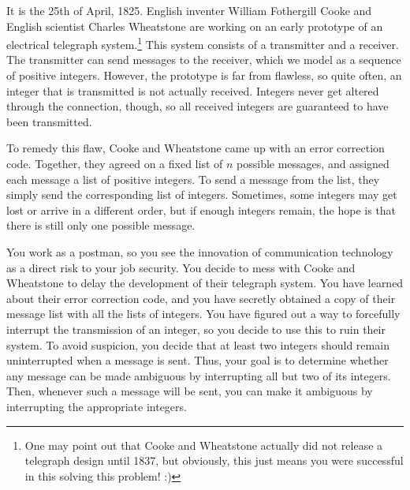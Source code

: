 

\newcommand{\maxn}{50\,000}
\newcommand{\maxk}{10^5}
\newcommand{\maxx}{10^9}

It is the 25th of April, 1825.
English inventer William Fothergill Cooke and English scientist Charles Wheatstone are working on an early prototype of an electrical telegraph system.\footnote{
    One may point out that Cooke and Wheatstone actually did not release a telegraph design until 1837,
    but obviously, this just means you were successful in this solving this problem! :)
}
This system consists of a transmitter and a receiver.
The transmitter can send messages to the receiver, which we model as a sequence of positive integers.
However, the prototype is far from flawless, so quite often, an integer that is transmitted is not actually received.
Integers never get altered through the connection, though, so all received integers are guaranteed to have been transmitted.

To remedy this flaw, Cooke and Wheatstone came up with an error correction code.
Together, they agreed on a fixed list of $n$ possible messages, and assigned each message a list of positive integers.
To send a message from the list, they simply send the corresponding list of integers.
Sometimes, some integers may get lost or arrive in a different order,
but if enough integers remain, the hope is that there is still only one possible message.

You work as a postman, so you see the innovation of communication technology as a direct risk to your job security.
You decide to mess with Cooke and Wheatstone to delay the development of their telegraph system.
You have learned about their error correction code, and you have secretly obtained a copy of their message list with all the lists of integers.
You have figured out a way to forcefully interrupt the transmission of an integer, so you decide to use this to ruin their system.
To avoid suspicion, you decide that at least two integers should remain uninterrupted when a message is sent.
Thus, your goal is to determine whether any message can be made ambiguous by interrupting all but two of its integers.
Then, whenever such a message will be sent, you can make it ambiguous by interrupting the appropriate integers.

